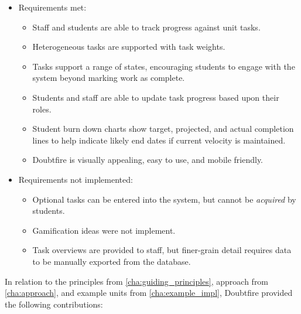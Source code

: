 \begin{itemize}[noitemsep,nolistsep]
  \item Requirements met:
  \begin{itemize}[noitemsep,nolistsep]
    \item Staff and students are able to track progress against unit tasks.
    \item Heterogeneous tasks are supported with task weights.
    \item Tasks support a range of states, encouraging students to engage with the system beyond marking work as complete.
    \item Students and staff are able to update task progress based upon their roles.
    \item Student burn down charts show target, projected, and actual completion lines to help indicate likely end dates if current velocity is maintained.
    \item Doubtfire is visually appealing, easy to use, and mobile friendly.
  \end{itemize}

  \item Requirements not implemented:
  \begin{itemize}[noitemsep,nolistsep]
    \item Optional tasks can be entered into the system, but cannot be \emph{acquired} by students.
    \item Gamification ideas were not implement.
    \item Task overviews are provided to staff, but finer-grain detail requires data to be manually exported from the database.
  \end{itemize}
\end{itemize}

In relation to the principles from \cref{cha:guiding_principles}, approach from \cref{cha:approach}, and example units from \cref{cha:example_impl}, Doubtfire provided the following contributions:

